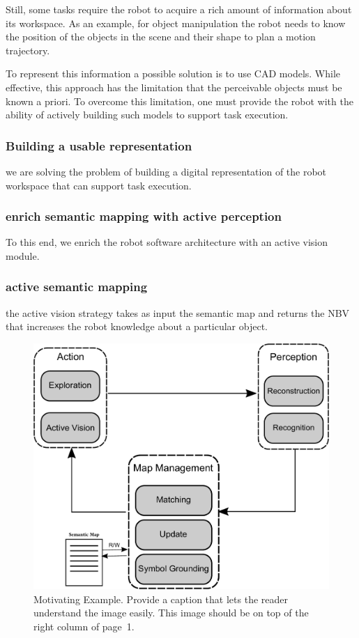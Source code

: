 \documentclass[conference]{IEEEtran}
\begin{document}
Still, some tasks require the robot to acquire a rich amount of
information about its workspace. As an example, for object
manipulation the robot needs to know the position of the objects in
the scene and their shape to plan a motion trajectory.

To represent this information a possible solution is to use CAD
models. While effective, this approach has the limitation that the
perceivable objects must be known a priori. To overcome this
limitation, one must provide the robot with the ability of actively
building such models to support task execution.

\subsubsection{Building a usable representation}
we are solving the problem of building a digital representation of the
robot workspace that can support task execution.

\subsubsection{enrich semantic mapping with active perception}
To this end, we enrich the robot software architecture with an active
vision module.

\subsubsection{active semantic mapping}
the active vision strategy takes as input the semantic map and returns
the NBV that increases the robot knowledge about a particular object.

\begin{figure}[t]
  \centering
 \includegraphics[width=\linewidth]{pics/motivation}
 \caption{Motivating Example. Provide a caption that lets the reader
   understand the image easily.  This image should be on top of the
   right column of page~1.}
  \label{fig:motivation}
\end{figure}
\end{document}
